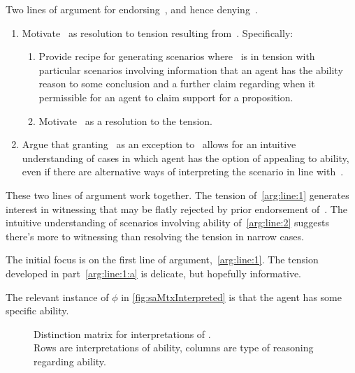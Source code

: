 \begin{note}
  Two lines of argument for endorsing~\EAS{}, and hence denying~\ESU{}.
  \begin{enumerate}[label=(L\arabic*), ref=(L\arabic*)]
  \item\label{arg:line:1} Motivate~\EAS{} as resolution to tension resulting from~\ESU{}.\newline
    Specifically:
    \begin{enumerate}[label=(L1\alph*)]
    \item\label{arg:line:1:a} Provide recipe for generating scenarios where~\ESU{} is in tension with particular scenarios involving information that an agent has the ability reason to some conclusion and a further claim regarding when it permissible for an agent to claim support for a proposition.
    \item\label{arg:line:1:b} Motivate~\EAS{} as a resolution to the tension.
    \end{enumerate}
  \item\label{arg:line:2} Argue that granting~\EAS{} as an exception to~\ESU{} allows for an intuitive understanding of cases in which agent has the option of appealing to ability, even if there are alternative ways of interpreting the scenario in line with~\ESU{}.
  \end{enumerate}
  These two lines of argument work together.
  The tension of~\ref{arg:line:1} generates interest in witnessing that may be flatly rejected by prior endorsement of~\ESU{}.
  The intuitive understanding of scenarios involving ability of~\ref{arg:line:2} suggests there's more to witnessing than resolving the tension in narrow cases.
\end{note}

\begin{note}
  The initial focus is on the first line of argument,~\ref{arg:line:1}.
  The tension developed in part~\ref{arg:line:1:a} is delicate, but hopefully informative.
\end{note}

\begin{note}
  \color{red}
  The relevant instance of \(\phi\) in \ref{fig:saMtxInterpreted} is that the agent has some specific ability.
\end{note}

\begin{note}[Table]
  \begin{figure}[H]
    \saMtxEmpty{}
    \caption{Distinction matrix for interpretations of . \\ Rows are interpretations of ability, columns are type of reasoning regarding ability.}
    \label{fig:saMtxEmpty}
  \end{figure}
\end{note}

